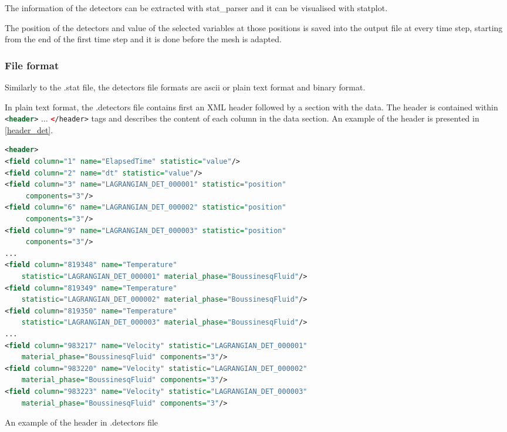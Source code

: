 The information of the detectors can be extracted with stat\_parser and it can be visualised with statplot. 

The position of the detectors and value of the selected variables at those positions is saved into the output file at every time step, starting from the end of the first time step and it is done before the mesh is adapted. 

\subsubsection{File format}
\label{sec:detectors_output}
Similarly to the .stat file, the detectors file formats are ascii or plain text format and binary format.

In plain text format, the .detectors file contains first an XML header followed by a section with the data. The header is contained within \lstinline[language = XML]*<header>* $\ldots$
\lstinline[language = XML]*</header>* tags and describes the content of each column in the data section. An example of the header is presented in \ref{header_det}.

\begin{example}
\begin{lstlisting}[language = XML]
<header>
<field column="1" name="ElapsedTime" statistic="value"/>
<field column="2" name="dt" statistic="value"/>
<field column="3" name="LAGRANGIAN_DET_000001" statistic="position" 
     components="3"/>
<field column="6" name="LAGRANGIAN_DET_000002" statistic="position" 
     components="3"/>
<field column="9" name="LAGRANGIAN_DET_000003" statistic="position" 
     components="3"/>
...
<field column="819348" name="Temperature" 
    statistic="LAGRANGIAN_DET_000001" material_phase="BoussinesqFluid"/>
<field column="819349" name="Temperature" 
    statistic="LAGRANGIAN_DET_000002" material_phase="BoussinesqFluid"/>
<field column="819350" name="Temperature" 
    statistic="LAGRANGIAN_DET_000003" material_phase="BoussinesqFluid"/>
...
<field column="983217" name="Velocity" statistic="LAGRANGIAN_DET_000001" 
    material_phase="BoussinesqFluid" components="3"/>
<field column="983220" name="Velocity" statistic="LAGRANGIAN_DET_000002" 
    material_phase="BoussinesqFluid" components="3"/>
<field column="983223" name="Velocity" statistic="LAGRANGIAN_DET_000003" 
    material_phase="BoussinesqFluid" components="3"/>
\end{lstlisting}

\caption{An example of the header in .detectors file}
\label{header_det}
\end{example}

